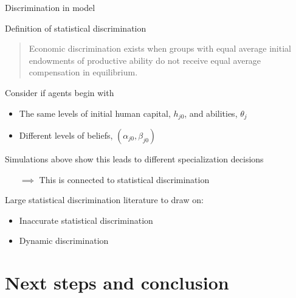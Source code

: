 \documentclass[compress, 8pt]{beamer}
\begin{document}
\begin{frame}{Discrimination in model}

\vspace{2ex}
Definition of statistical discrimination 
\begin{quote}
Economic discrimination exists when groups with equal average initial endowments of productive ability do not receive equal average compensation in equilibrium.
\end{quote}

\vspace{3ex}
Consider if agents begin with
\begin{itemize}
    \item The same levels of initial human capital, $h_{j0}$, and abilities, $\theta_j$
    \item Different levels of beliefs, $(\alpha_{j0}, \beta_{j0})$
\end{itemize}

\vspace{3ex}
Simulations above show this leads to different specialization decisions
\begin{itemize}
    \item [$\implies$] This is connected to statistical discrimination
\end{itemize}

\vspace{3ex}
Large statistical discrimination literature to draw on:
\begin{itemize}
    \item Inaccurate statistical discrimination
    \item Dynamic discrimination
\end{itemize}


\end{frame}

\miniframesoff
\section[Next steps]{Next steps and conclusion}
\begin{frame}
    \tableofcontents[currentsection]
\end{frame}
\miniframeson
\end{document}
